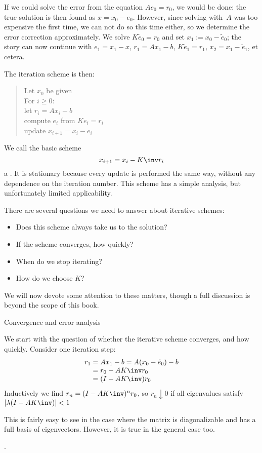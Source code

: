 If we could solve the error from the equation $Ae_0=r_0$, we would be
done: the true solution is then found as $x=x_0-e_0$. However,
since solving with~$A$ was
too expensive the first time, we can not do so this time either, so we
determine the error correction approximately.
We solve $K\tilde e_0=r_0$ and set $x_1:=x_0-\tilde e_0$; the story can now
continue with $e_1=x_1-x$, $r_1=Ax_1-b$, $K\tilde e_1=r_1$,
$x_2=x_1-\tilde e_1$, et cetera.

The iteration scheme is then:
  \begin{quote}
\begin{tabbing}
  Let $x_0$ be given\\
  For $i\geq0$\=:\\
  \>let $r_i=Ax_i-b$\\
  \>compute $e_i$ from $Ke_i=r_i$\\
  \>update $x_{i+1}=x_i-e_i$
\end{tabbing}
  \end{quote}
We call the basic scheme
\begin{equation}
  x_{i+1}=x_i-K\inv r_i
  \label{eq:stat-it}
\end{equation}
a . It is stationary
because every update is performed the same way, without any dependence
on the iteration number. This scheme has a simple analysis, but
unfortunately limited applicability.

There are several questions we need to answer about iterative schemes:
\begin{itemize}
\item Does this scheme always take us to the solution?
\item If the scheme converges, how quickly?
\item When do we stop iterating?
\item How do we choose $K$?
\end{itemize}
We will now devote some attention to these matters, though a full
discussion is beyond the scope of this book.

 {Convergence and error analysis}
\label{sec:stationary-convergence}

We start with the question of whether the iterative scheme converges,
and how quickly. Consider one iteration step:
\begin{equation}
  \begin{array}{r@{{}={}}l}
    r_1&Ax_1-b=A(x_0-\tilde e_0)-b\\
    &r_0-AK\inv r_0\\
    &(I-AK\inv)r_0
  \end{array}
\end{equation}
Inductively we find $r_n=(I-AK\inv)^nr_0$, so $r_n\downarrow0$ if
all eigenvalues satisfy $|\lambda(I-AK\inv)|<1$
\begin{footnoteenv}  
  {This is fairly easy to see in the case where the matrix is diagonalizable
  and has a full basis of eigenvectors. However, it is true in the
  general case too.}
\end{footnoteenv}%
.

